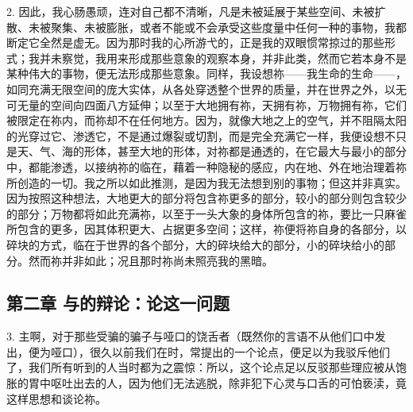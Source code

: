 2. 因此，我心肠愚顽，连对自己都不清晰，凡是未被延展于某些空间、未被扩散、未被聚集、未被膨胀，或者不能或不会承受这些度量中任何一种的事物，我都断定它全然是虚无。因为那时我的心所游弋的，正是我的双眼惯常掠过的那些形式；我并未察觉，我用来形成那些意象的观察本身，并非此类，然而它若本身不是某种伟大的事物，便无法形成那些意象。同样，我设想祢——我生命的生命——，如同充满无限空间的庞大实体，从各处穿透整个世界的质量，并在世界之外，以无可无量的空间向四面八方延伸；以至于大地拥有祢，天拥有祢，万物拥有祢，它们被限定在祢内，而祢却不在任何地方。因为，就像大地之上的空气，并不阻隔太阳的光穿过它、渗透它，不是通过爆裂或切割，而是完全充满它一样，我便设想不只是天、气、海的形体，甚至大地的形体，对祢都是通透的，在它最大与最小的部分中，都能渗透，以接纳祢的临在，藉着一种隐秘的感应，内在地、外在地治理着祢所创造的一切。我之所以如此推测，是因为我无法想到别的事物；但这并非真实。因为按照这种想法，大地更大的部分将包含祢更多的部分，较小的部分则包含较少的部分；万物都将如此充满祢，以至于一头大象的身体所包含的祢，要比一只麻雀所包含的更多，因其体积更大、占据更多空间；这样，祢便将祢自身的各部分，以碎块的方式，临在于世界的各个部分，大的碎块给大的部分，小的碎块给小的部分。然而祢并非如此；况且那时祢尚未照亮我的黑暗。\par


\subsection{第二章 与的辩论：论这一问题}

3. 主啊，对于那些受骗的骗子与哑口的饶舌者（既然你的言语不从他们口中发出，便为哑口），很久以前我们在时，常提出的一个论点，便足以为我驳斥他们了，我们所有听到的人当时都为之震惊：所以，这个论点足以反驳那些理应被从饱胀的胃中呕吐出去的人，因为他们无法逃脱，除非犯下心灵与口舌的可怕亵渎，竟这样思想和谈论祢。\par

